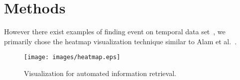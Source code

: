 ﻿\section{Methods}
However there exist examples of finding event on temporal data set~\cite{sakaki2010earthquake}, we primarily chose the heatmap visualization technique similar to Alam et al.~\cite{alamdata}.
\begin{figure}[htb]
  \centering
  \texttt{[image: images/heatmap.eps]}
  \caption{Visualization for automated information retrieval.}
	\label{fig:heatmap}
\end{figure} 